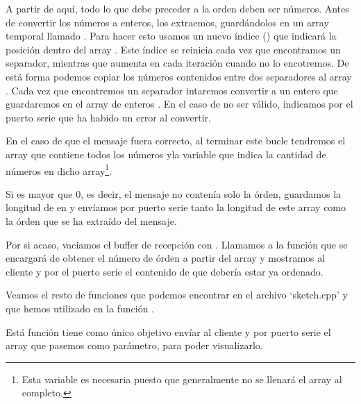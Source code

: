 A partir de aquí, todo lo que debe preceder a la orden deben ser números. Antes de convertir los números a enteros, los extraemos, guardándolos en un array temporal llamado . Para hacer esto usamos un nuevo índice () que indicará la posición dentro del array . Este índice se reinicia cada vez que encontramos un separador, mientras que aumenta en cada iteración cuando no lo encotremos. De está forma podemos copiar los números contenidos entre dos separadores al array . Cada vez que encontremos un separador intaremos convertir  a un entero que guardaremos en el array de enteros . En el caso de no ser válido, indicamos por el puerto serie que ha habido un error al convertir.

En el caso de que el mensaje fuera correcto, al terminar este bucle tendremos el array  que contiene todos los números yla variable  que indica la cantidad de números en dicho array\protect\footnote{Esta variable es necesaria puesto que generalmente no se llenará el array al completo.}. 


Si  es mayor que 0, es decir, el mensaje no contenía solo la órden, guardamos la longitud de  en  y envíamos por puerto serie tanto la longitud de este array como la órden que se ha extraído del mensaje.


Por si acaso, vaciamos el buffer de recepción con . Llamamos a la función  que se encargará de obtener el número de órden a partir del array  y mostramos al cliente y por el puerto serie el contenido de  que debería estar ya ordenado.

Veamos el resto de funciones que podemos encontrar en el archivo `sketch.cpp' y que hemos utilizado en la función .


Está función tiene como único objetivo envíar al cliente y por puerto serie el array que pasemos como parámetro, para poder visualizarlo.


